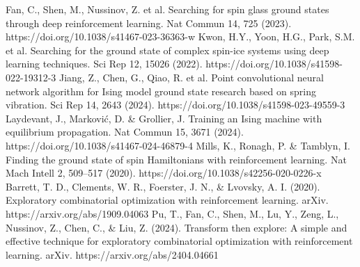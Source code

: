 \documentclass{article}
\begin{document}
\begin{thebibliography}{00}
Fan, C., Shen, M., Nussinov, Z. et al. Searching for spin glass ground states through deep reinforcement learning. Nat Commun 14, 725 (2023). https://doi.org/10.1038/s41467-023-36363-w
Kwon, H.Y., Yoon, H.G., Park, S.M. et al. Searching for the ground state of complex spin-ice systems using deep learning techniques. Sci Rep 12, 15026 (2022). https://doi.org/10.1038/s41598-022-19312-3
Jiang, Z., Chen, G., Qiao, R. et al. Point convolutional neural network algorithm for Ising model ground state research based on spring vibration. Sci Rep 14, 2643 (2024). https://doi.org/10.1038/s41598-023-49559-3
Laydevant, J., Marković, D. \& Grollier, J. Training an Ising machine with equilibrium propagation. Nat Commun 15, 3671 (2024). https://doi.org/10.1038/s41467-024-46879-4
Mills, K., Ronagh, P. \& Tamblyn, I. Finding the ground state of spin Hamiltonians with reinforcement learning. Nat Mach Intell 2, 509–517 (2020). https://doi.org/10.1038/s42256-020-0226-x
Barrett, T. D., Clements, W. R., Foerster, J. N., \& Lvovsky, A. I. (2020). Exploratory combinatorial optimization with reinforcement learning. arXiv. https://arxiv.org/abs/1909.04063
Pu, T., Fan, C., Shen, M., Lu, Y., Zeng, L., Nussinov, Z., Chen, C., \& Liu, Z. (2024). Transform then explore: A simple and effective technique for exploratory combinatorial optimization with reinforcement learning. arXiv. https://arxiv.org/abs/2404.04661

\end{thebibliography}
\end{document}
